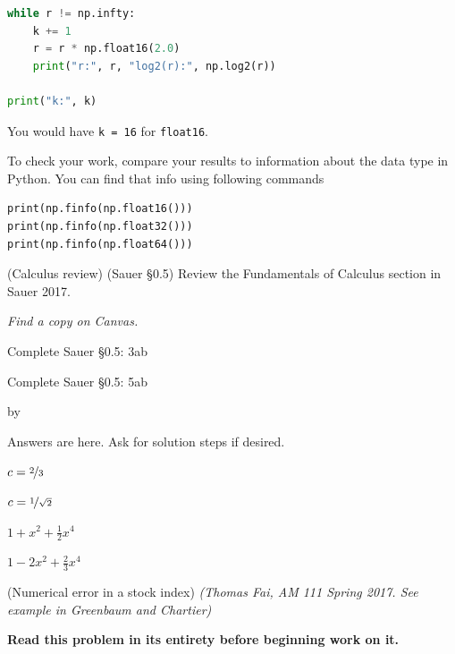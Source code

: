 \documentclass[12pt,letterpaper,answers]{exam}
\makeatletter
\def\SetTotalwidth{\advance\linewidth by \@totalleftmargin
\@totalleftmargin=0pt}
\makeatother
\begin{document}
\begin{questions}
\begin{parts}
\begin{solution}
\begin{lstlisting}[language=Python]
while r != np.infty:
    k += 1
    r = r * np.float16(2.0)
    print("r:", r, "log2(r):", np.log2(r))

print("k:", k)
\end{lstlisting}
You would have \texttt{k = 16} for \texttt{float16}.
\end{solution}
 
\item To check your work, compare your results to information about the data type in Python.  You can find that info using following commands

\begin{verbatim}
print(np.finfo(np.float16()))
print(np.finfo(np.float32()))
print(np.finfo(np.float64()))    
\end{verbatim}


\end{parts}

\question (Calculus review) (Sauer \S0.5) Review the Fundamentals of Calculus section in Sauer 2017. 

\emph{Find a copy on Canvas.} 
\begin{parts}
\item Complete Sauer \S0.5: 3ab
\item Complete Sauer \S0.5: 5ab
\end{parts}

\SetTotalwidth
\begin{solution}
Answers are here.  Ask for solution steps if desired.
\begin{parts}
\item
    \begin{subparts}
    \item $c=\nicefrac{2}{3}$
    \item $c=\nicefrac{1}{\sqrt{2}}$
    \end{subparts}
\item
    \begin{subparts}
    \item $1 + x^2 + \frac{1}{2}x^4$
    \item $1 - 2x^2 + \frac{2}{3}x^4$
    \end{subparts}
\end{parts}
\end{solution}


\question (Numerical error in a stock index) \emph{(Thomas Fai, AM 111 Spring 2017.  See example in Greenbaum and Chartier) }

\textbf{Read this problem in its entirety before beginning work on it.}



\end{questions}
\end{document}
